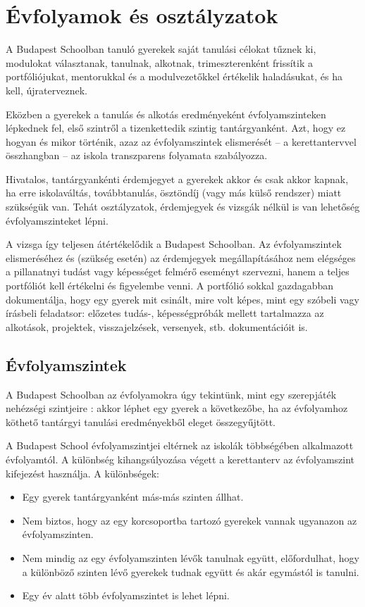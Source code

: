 \section{Évfolyamok és osztályzatok}
\label{sec:evfolyamok_osztalyzatok}
A Budapest Schoolban tanuló gyerekek saját tanulási célokat tűznek ki, modulokat választanak, tanulnak, alkotnak, trimeszterenként frissítik a portfóliójukat, mentorukkal és a modulvezetőkkel értékelik haladásukat, és ha kell, újraterveznek.

Eközben a gyerekek a tanulás és alkotás eredményeként évfolyamszinteken lépkednek fel, első szintről a tizenkettedik szintig tantárgyanként. Azt, hogy ez hogyan és mikor történik, azaz az évfolyamszintek elismerését -- a kerettantervvel összhangban -- az iskola transzparens folyamata szabályozza.

Hivatalos, tantárgyankénti érdemjegyet a gyerekek akkor és csak akkor kapnak, ha erre iskolaváltás, továbbtanulás, ösztöndíj (vagy más külső rendszer) miatt szükségük van. Tehát osztályzatok, érdemjegyek és vizsgák nélkül is van lehetőség évfolyamszinteket lépni.

A vizsga így teljesen átértékelődik a Budapest Schoolban. Az évfolyamszintek elismeréséhez és (szükség esetén) az érdemjegyek megállapításához nem elégséges a pillanatnyi tudást vagy képességet felmérő eseményt szervezni, hanem a teljes portfóliót kell értékelni és figyelembe venni. A portfólió sokkal gazdagabban dokumentálja, hogy egy gyerek mit csinált, mire volt képes, mint egy szóbeli vagy írásbeli feladatsor: előzetes tudás-, képességpróbák mellett tartalmazza az alkotások, projektek, visszajelzések, versenyek, stb. dokumentációit is.

\subsection{Évfolyamszintek}
\label{sec:evfolyamok}

A Budapest Schoolban az évfolyamokra úgy tekintünk, mint egy szerepjáték nehézségi szintjeire \citep{wiki:game_levels}: akkor léphet egy gyerek a következőbe, ha az évfolyamhoz köthető tantárgyi tanulási eredményekből eleget összegyűjtött.

A Budapest School évfolyamszintjei eltérnek az iskolák többségében alkalmazott évfolyamtól. A különbség kihangsúlyozása végett a kerettanterv az évfolyamszint kifejezést használja. A különbségek:

\begin{itemize}
      \item Egy gyerek tantárgyanként más-más szinten állhat.
      \item Nem biztos, hogy az egy korcsoportba tartozó gyerekek vannak ugyanazon az évfolyamszinten.

      \item Nem mindig az egy évfolyamszinten lévők tanulnak együtt, előfordulhat, hogy a különböző szinten lévő gyerekek tudnak együtt és akár egymástól is tanulni.

      \item Egy év alatt több évfolyamszintet is lehet lépni.
\end{itemize}

